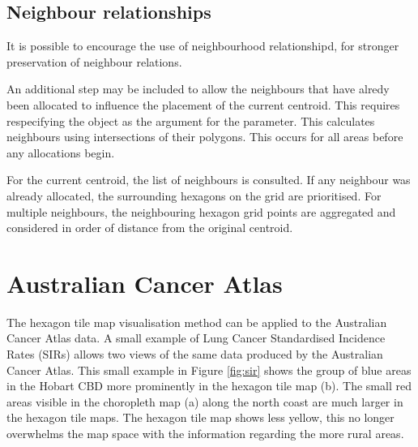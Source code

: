 \documentclass[
]{jss}
\begin{document}
\hypertarget{neighbour-relationships}{%
\subsection{Neighbour relationships}\label{neighbour-relationships}}

It is possible to encourage the use of neighbourhood relationshipd, for
stronger preservation of neighbour relations.

An additional step may be included to allow the neighbours that have
alredy been allocated to influence the placement of the current
centroid. This requires respecifying the  object as the
argument for the  parameter. This calculates
neighbours using intersections of their polygons. This occurs for all
areas before any allocations begin.

For the current centroid, the list of neighbours is consulted. If any
neighbour was already allocated, the surrounding hexagons on the grid
are prioritised. For multiple neighbours, the neighbouring hexagon grid
points are aggregated and considered in order of distance from the
original centroid.

\hypertarget{australian-cancer-atlas}{%
\section{Australian Cancer Atlas}\label{australian-cancer-atlas}}

The hexagon tile map visualisation method can be applied to the
Australian Cancer Atlas data. A small example of Lung Cancer
Standardised Incidence Rates (SIRs) allows two views of the same data
produced by the Australian Cancer Atlas. This small example in Figure
\ref{fig:sir} shows the group of blue areas in the Hobart CBD more
prominently in the hexagon tile map (b). The small red areas visible in
the choropleth map (a) along the north coast are much larger in the
hexagon tile maps. The hexagon tile map shows less yellow, this no
longer overwhelms the map space with the information regarding the more
rural areas.
\end{document}
